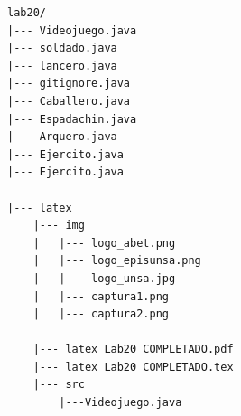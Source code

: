 \documentclass{article}
\begin{document}
\begin{lstlisting}[style=ascii-tree]
lab20/
|--- Videojuego.java
|--- soldado.java
|--- lancero.java
|--- gitignore.java
|--- Caballero.java
|--- Espadachin.java
|--- Arquero.java
|--- Ejercito.java
|--- Ejercito.java

|--- latex
    |--- img
    |   |--- logo_abet.png
    |   |--- logo_episunsa.png
    |   |--- logo_unsa.jpg
    |   |--- captura1.png    
    |   |--- captura2.png    

    |--- latex_Lab20_COMPLETADO.pdf    
    |--- latex_Lab20_COMPLETADO.tex
    |--- src
        |---Videojuego.java
\end{lstlisting}    













			
\end{document}
